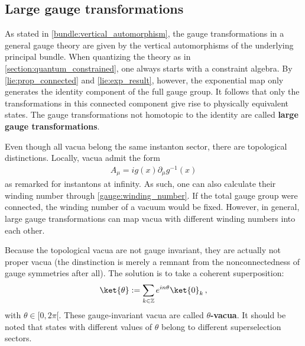 \subsection{Large gauge transformations}


    As stated in \cref{bundle:vertical_automorphism}, the gauge transformations in a general gauge theory are given by the vertical automorphisms of the underlying principal bundle. When quantizing the theory as in \cref{section:quantum_constrained}, one always starts with a constraint algebra. By \cref{lie:prop_connected} and \cref{lie:exp_result}, however, the exponential map only generates the identity component of the full gauge group. It follows that only the transformations in this connected component give rise to physically equivalent states. The gauge transformations not homotopic to the identity are called \textbf{large gauge transformations}.

    Even though all vacua belong the same instanton sector, there are topological distinctions. Locally, vacua admit the form
    \begin{gather}
        A_\mu = ig(x)\partial_\mu g^{-1}(x)
    \end{gather}
    as remarked for instantons at infinity. As such, one can also calculate their winding number through \cref{gauge:winding_number}. If the total gauge group were connected, the winding number of a vacuum would be fixed. However, in general, large gauge transformations can map vacua with different winding numbers into each other.
    
    Because the topological vacua are not gauge invariant, they are actually not proper vacua (the dinstinction is merely a remnant from the nonconnectedness of gauge symmetries after all). The solution is to take a coherent superposition:
    \begin{gather}
        \label{gauge:theta_vacuum}
        \ket{\theta} := \sum_{k\in\mathbb{Z}}e^{in\theta}\ket{0}_k\,,
    \end{gather}
    with $\theta\in[0,2\pi[$. These gauge-invariant vacua are called \textbf{$\theta$-vacua}. It should be noted that states with different values of $\theta$ belong to different superselection sectors.
    
